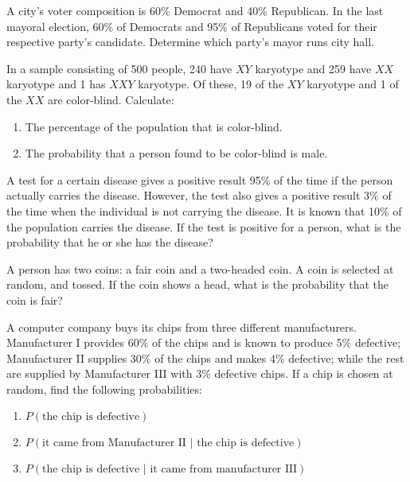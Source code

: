 \begin{puzzle}
    A city's voter composition is 60\% Democrat and 40\% Republican. In the last mayoral election, 60\% of Democrats and 95\% of Republicans voted for their respective party's candidate. Determine which party's mayor runs city hall.
\end{puzzle}

\begin{puzzle}
    In a sample consisting of 500 people, 240 have $XY$ karyotype and 259 have $XX$ karyotype and 1 has $XXY$ karyotype. Of these, 19 of the $XY$ karyotype and 1 of the $XX$ are color-blind. Calculate:
    \begin{enumerate}
        \item The percentage of the population that is color-blind.
        \item The probability that a person found to be color-blind is male.
    \end{enumerate}
\end{puzzle}

\begin{puzzle}
    A test for a certain disease gives a positive result 95\% of the time if the person actually carries the disease. However, the test also gives a positive result 3\% of the time when the individual is not carrying the disease. It is known that 10\% of the population carries the disease. If the test is positive for a person, what is the probability that he or she has the disease?
\end{puzzle}

\begin{puzzle}
    A person has two coins: a fair coin and a two-headed coin. A coin is selected at random, and tossed. If the coin shows a head, what is the probability that the coin is fair?
\end{puzzle}

\begin{puzzle}
    A computer company buys its chips from three different manufacturers. Manufacturer I provides 60\% of the chips and is known to produce 5\% defective; Manufacturer II supplies 30\% of the chips and makes 4\% defective; while the rest are supplied by Manufacturer III with 3\% defective chips. If a chip is chosen at random, find the following probabilities:
    \begin{enumerate}
        \item \( P(\text{the chip is defective}) \)
        \item \( P(\text{it came from Manufacturer II } | \text{ the chip is defective}) \)
        \item \( P(\text{the chip is defective } | \text{ it came from manufacturer III}) \)
    \end{enumerate}
\end{puzzle}

